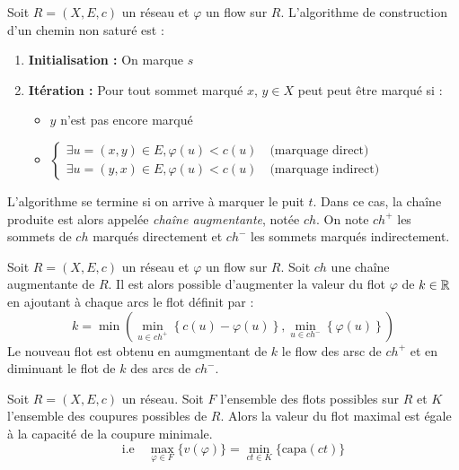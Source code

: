 \begin{definition}
    Soit $R = (X, E, c)$ un réseau et $ \varphi$ un flow sur $R$. 
    L'algorithme de construction d'un chemin non saturé est : 
    \begin{enumerate}
        \item \textbf{Initialisation : } On marque $s$ 
        \item \textbf{Itération : } Pour tout sommet marqué $x$, $y \in X$ peut peut être marqué si : 
            \begin{itemize}
                \item $y$ n'est pas encore marqué 
                \item $ 
                    \begin{cases}
                        \exists u = (x,y) \in E, \varphi(u) < c (u) \quad \text{(marquage direct)} \\  
                        \exists u = (y,x) \in E, \varphi(u) < c(u) \quad \text{(marquage indirect)}
                    \end{cases}
                    $ 
            \end{itemize}
    \end{enumerate}
    L'algorithme se termine si on arrive à marquer le puit $t$. Dans ce cas, la chaîne produite est alors appelée 
    \emph{chaîne augmentante}, notée $ch$. 
    On note $ch^+$ les sommets de $ch$ marqués directement et $ch^-$ les sommets marqués 
    indirectement. 
\end{definition}

\begin{prop}
    Soit $R = (X, E, c)$ un réseau et $ \varphi$ un flow sur $R$. Soit $ch$ une chaîne augmentante de $R$. 
    Il est alors possible d'augmenter la valeur du flot $ \varphi$ de $k \in \mathbb{R}$ en ajoutant à 
    chaque arcs le flot définit par : 
        $$ \boxed{k = \min \left( \min_{u \in ch^+} \left\{c(u) - \varphi(u)\right\}, \min_{u \in ch^-} \left\{ \varphi (u)\right\}\right)} $$
    Le nouveau flot est obtenu en aumgmentant de $k$ le flow des arsc de $ch^+$ et en diminuant le flot de $k$ 
    des arcs de $ch^-$. 
\end{prop}

\begin{theorem}
    Soit $R = (X, E, c)$ un réseau. Soit $F$ l'ensemble des flots possibles sur $R$ et 
    $K$ l'ensemble des coupures possibles de $R$. 
    Alors la valeur du flot maximal est égale à la capacité de la coupure minimale. 
        $$ \boxed{\text{i.e} \quad \max_{ \varphi \in F} \{v( \varphi)\} = \min_{ct \in K} \{\text{capa}(ct)\}} $$   
\end{theorem}

